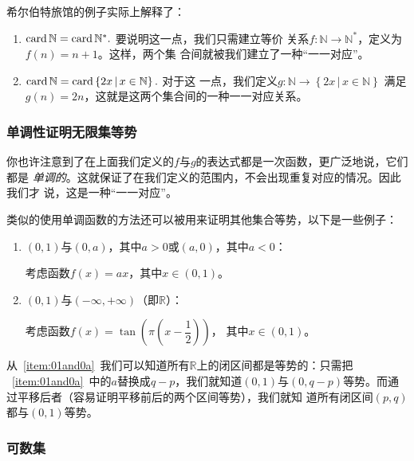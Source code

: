 \vspace{3ex}

希尔伯特旅馆的例子实际上解释了：
\begin{enumerate}
    \item $\operatorname{card}\mathbb{N}=\operatorname{card}\mathbb{N}^\ast.$ 要说明这一点，我们只需建立等价
        关系$f: \mathbb{N} \to \mathbb{N}^\ast$，定义为$f(n)=n+1$。这样，两个集
        合间就被我们建立了一种“一一对应”。

    \item $\operatorname{card}\mathbb{N}=\operatorname{card}\left\{ 2x\,|\,x\in\mathbb{N} \right\}.$ 对于这
        一点，我们定义$g: \mathbb{N} \to \left\{ 2x\,|\,x\in\mathbb{N} \right\}$
        满足$g(n)=2n$，这就是这两个集合间的一种一一对应关系。
\end{enumerate}

\subsubsection{单调性证明无限集等势}

你也许注意到了在上面我们定义的$f$与$g$的表达式都是一次函数，更广泛地说，它们都是
\emph{单调的}。这就保证了在我们定义的范围内，不会出现重复对应的情况。因此我们才
说，这是一种“一一对应”。

类似的使用单调函数的方法还可以被用来证明其他集合等势，以下是一些例子：

\begin{enumerate}
    \item $\left( 0,1 \right) $与$\left( 0,a \right) $，其中$a > 0$或$\left( a,0 
        \right) $，其中$a < 0$：\label{item:01and0a}

        考虑函数$f(x)=ax$，其中$x\in \left( 0,1 \right)$。

    \item $\left( 0,1 \right) $与$\left( -\infty,+\infty \right) $（即$\mathbb{R}
        $）：

        考虑函数$f(x)=\tan \left( \pi \left( x - \dfrac{1}{2} \right)  \right) $，
        其中$x\in \left( 0,1 \right) $。
\end{enumerate}

从~\ref{item:01and0a}~我们可以知道所有$\mathbb{R}$上的闭区间都是等势的：只需把%
~\ref{item:01and0a}~中的$a$替换成$q-p$，我们就知道$\left( 0,1 \right) $与$\left( 
0,q-p \right) $等势。而通过平移后者（容易证明平移前后的两个区间等势），我们就知
道所有闭区间$\left( p,q\right) $都与$\left( 0,1 \right) $等势。

\subsubsection{可数集}

